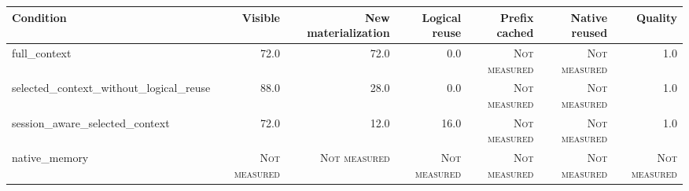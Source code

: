 \begin{tabular}{lrrrrrr}
\toprule
Condition & Visible & New materialization & Logical reuse & Prefix cached & Native reused & Quality \\
\midrule
full\_context & 72.0 & 72.0 & 0.0 & \textsc{Not measured} & \textsc{Not measured} & 1.0 \\
selected\_context\_without\_logical\_reuse & 88.0 & 28.0 & 0.0 & \textsc{Not measured} & \textsc{Not measured} & 1.0 \\
session\_aware\_selected\_context & 72.0 & 12.0 & 16.0 & \textsc{Not measured} & \textsc{Not measured} & 1.0 \\
native\_memory & \textsc{Not measured} & \textsc{Not measured} & \textsc{Not measured} & \textsc{Not measured} & \textsc{Not measured} & \textsc{Not measured} \\
\bottomrule
\end{tabular}
